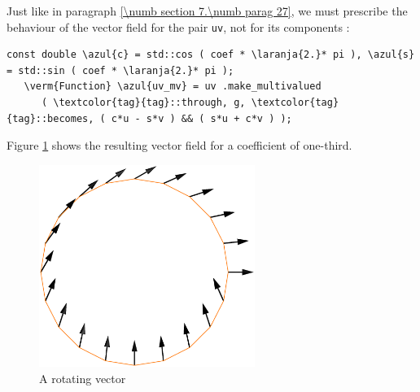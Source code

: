 Just like in paragraph \ref{\numb section 7.\numb parag 27}, we must prescribe the behaviour of
the vector field for the pair {\small\tt uv}, not for its components :

\begin{Verbatim}[commandchars=\\\{\},formatcom=\small\tt,frame=single,
   label=parag-\ref{\numb section 7.\numb parag 28}.cpp,rulecolor=\color{moldura},
   baselinestretch=0.94,framesep=2mm                                              ]
   const double \azul{c} = std::cos ( coef * \laranja{2.}* pi ), \azul{s} = std::sin ( coef * \laranja{2.}* pi );
   \verm{Function} \azul{uv_mv} = uv .make_multivalued
      ( \textcolor{tag}{tag}::through, g, \textcolor{tag}{tag}::becomes, ( c*u - s*v ) && ( s*u + c*v ) );
\end{Verbatim}

Figure \ref{\numb section 7.\numb fig 24} shows
the resulting vector field for a coefficient of one-third.

\begin{figure}[ht] \centering
  \includegraphics[width=70mm]{circle-conca-coef.eps}
  \caption{A rotating vector}
  \label{\numb section 7.\numb fig 24}
\end{figure}


